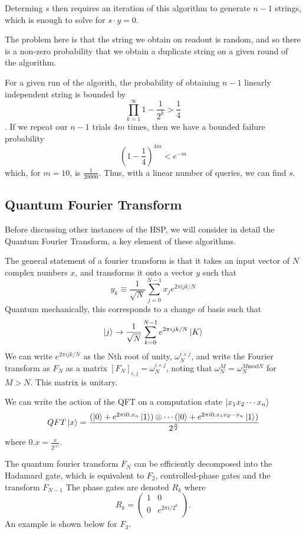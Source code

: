 \documentclass[11pt]{article}
\begin{document}
Determing $s$ then requires an iteration of this algorithm to generate $n-1$ strings, which is enough to solve for $s\cdot y = 0$.

The problem here is that the string we obtain on readout is random, and so there is a non-zero probability that we obtain a duplicate string on a given round of the algorithm.

For a given run of the algorith, the probability of obtaining $n-1$ linearly independent string is bounded by
\[\prod_{k=1}^{\infty}1-\frac{1}{2^{k}}>\frac{1}{4}\].
If we repeat our $n-1$ trials $4m$ times, then we have a bounded failure probability
\[(1-\frac{1}{4})^{4m}<e^{-m}\]
which, for $m = 10$, is $\frac{1}{20000}$. Thus, with a linear number of queries, we can find $s$.

\subsection*{Quantum Fourier Transform}
Before discussing other instances of the HSP, we will consider in detail the Quantum Fourier Transform, a key element of these algorithms.

The general statement of a fourier transform is that it takes an input vector of $N$ complex numbers $x$, and transforms it onto a vector $y$ such that
\begin{equation}
    y_{k} \equiv \frac{1}{\sqrt{N}}\sum_{j=0}^{N-1} x_{j}e^{2\pi i j k / N}
\end{equation}
Quantum mechanically, this corresponds to a change of basis such that
\[\ket{j}\rightarrow \frac{1}{\sqrt{N}}\sum_{k=0}^{N-1}e^{2\pi i j k / N}\ket{K}\]
We can write $e^{2\pi i j k / N}$ as the Nth root of unity, $\omega_{N}^{i\times j}$, and write the Fourier transform as $F_{N}$ as a matrix $[F_{N}]_{i,j} = \omega_{N}^{i \times j}$, noting that $\omega_{N}^{M} = \omega_{N}^{M \text{mod} N}$ for $M>N$. This matrix is unitary.

We can write the action of the QFT on a computation state $\ket{x_{1}x_{2}\cdots x_{n}}$
\begin{equation}
    QFT\ket{x} = \frac{(\ket{0}+e^{2\pi i 0. x_{n}}\ket{1})\otimes\cdots(\ket{0}+e^{2\pi i 0. x_{1}x_{2}\cdots x_{n}}\ket{1})}{2^{\frac{n}{2}}}
\end{equation}
where $0.x = \frac{x}{2^{\vert x \vert}}$.


The quantum fourier transform $F_{N}$ can be efficiently decomposed into the Hadamard gate, which is equivalent to $F_{2}$, controlled-phase gates and the transform $F_{N-1}$ The phase gates are denoted $R_{k}$ where
\[R_{k}=\begin{pmatrix}1 & 0 \\ 0 & e^{2\pi i /2^{k}}\\\end{pmatrix}.\] An example is shown below for $F_{3}$.
\end{document}
